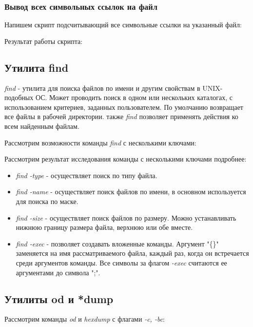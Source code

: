 \documentclass[14pt,a4paper,report]{report}
\begin{document}
\subsubsection{Вывод всех символьных ссылок на файл}

Напишем скрипт подсчитывающий все символьные ссылки на указанный файл:



Результат работы скрипта:



\subsection{}

\subsection{Утилита find}

\emph{find} - утилита для поиска файлов по имени и другим свойствам в UNIX-подобных ОС. Может проводить поиск в одном или нескольких каталогах, с использованием критериев, заданных пользователем. По умолчанию возвращает все файлы в рабочей директории. также \emph{find} позволяет применять действия ко всем найденным файлам.

Рассмотрим возможности команды \emph{find} с несколькими ключами:



Рассмотрим результат исследования команды с несколькими ключами подробнее:

\begin{itemize}
	\item \emph{find -type} - осуществляет поиск по типу файла.
	\item \emph{find -name} - осуществляет поиск файлов по имени, в основном используется для поиска по маске.
	\item \emph{find -size} - осуществляет поиск файлов по размеру. Можно устанавливать нижнюю границу размера файла, верхнюю или обе вместе.
	\item \emph{find -exec} - позволяет создавать вложенные команды. Аргумент "\{\}" заменяется на имя рассматриваемого файла, каждый раз, когда он встречается среди аргументов команды. Все символы за флагом \emph{-exec} считаются ее аргументами до символа ";".
\end{itemize}

\subsection{Утилиты od и *dump}

Рассмотрим команды \emph{od} и \emph{hexdump} с флагами \emph{-c, -bc}:


\end{document}
